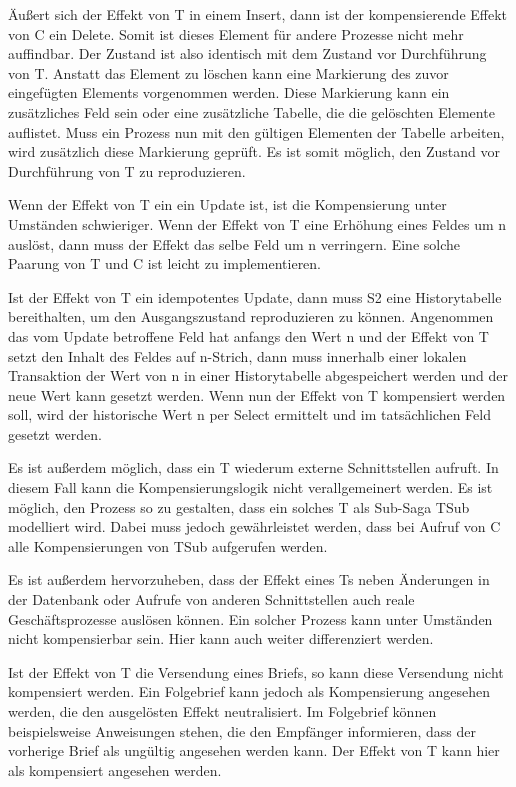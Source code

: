 Äußert sich der Effekt von T in einem Insert, dann ist der kompensierende Effekt von C ein Delete. Somit ist dieses Element für andere Prozesse nicht mehr auffindbar. Der Zustand ist also identisch mit dem Zustand vor Durchführung von T. Anstatt das Element zu löschen kann eine Markierung des zuvor eingefügten Elements vorgenommen werden. Diese Markierung kann ein zusätzliches Feld sein oder eine zusätzliche Tabelle, die die gelöschten Elemente auflistet. Muss ein Prozess nun mit den gültigen Elementen der Tabelle arbeiten, wird zusätzlich diese Markierung geprüft. Es ist somit möglich, den Zustand vor Durchführung von T zu reproduzieren. 

Wenn der Effekt von T ein ein Update ist, ist die Kompensierung unter Umständen schwieriger. Wenn der Effekt von T eine Erhöhung eines Feldes um n auslöst, dann muss der Effekt das selbe Feld um n verringern. Eine solche Paarung von T und C ist leicht zu implementieren. 

Ist der Effekt von T ein idempotentes Update, dann muss S2 eine Historytabelle bereithalten, um den Ausgangszustand reproduzieren zu können. Angenommen das vom Update betroffene Feld hat anfangs den Wert n und der Effekt von T setzt den Inhalt des Feldes auf n-Strich, dann muss innerhalb einer lokalen Transaktion der Wert von n in einer Historytabelle abgespeichert werden und der neue Wert kann gesetzt werden. Wenn nun der Effekt von T kompensiert werden soll, wird der historische Wert n per Select ermittelt und im tatsächlichen Feld gesetzt werden. 

Es ist außerdem möglich, dass ein T wiederum externe Schnittstellen aufruft. In diesem Fall kann die Kompensierungslogik nicht verallgemeinert werden. Es ist möglich, den Prozess so zu gestalten, dass ein solches T als Sub-Saga TSub modelliert wird. Dabei muss jedoch gewährleistet werden, dass bei Aufruf von C alle Kompensierungen von TSub aufgerufen werden. 


Es ist außerdem hervorzuheben, dass der Effekt eines Ts neben Änderungen in der Datenbank oder Aufrufe von anderen Schnittstellen auch reale Geschäftsprozesse auslösen können. Ein solcher Prozess kann unter Umständen nicht kompensierbar sein. Hier kann auch weiter differenziert werden. 

Ist der Effekt von T die Versendung eines Briefs, so kann diese Versendung nicht kompensiert werden. Ein Folgebrief kann jedoch als Kompensierung angesehen werden, die den ausgelösten Effekt neutralisiert. Im Folgebrief können beispielsweise Anweisungen stehen, die den Empfänger informieren, dass der vorherige Brief als ungültig angesehen werden kann. Der Effekt von T kann hier als kompensiert angesehen werden. 

